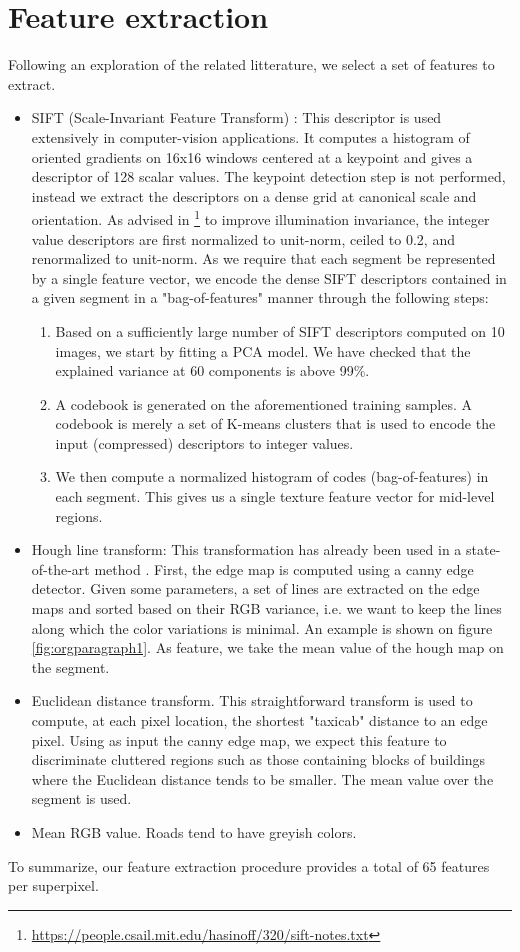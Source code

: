\documentclass[10pt,conference,compsocconf]{IEEEtran}
\begin{document}
\section{Feature extraction}
\label{sec:orgheadline9}
Following an exploration of the related litterature, we select a set of features to extract.
\begin{itemize}
\item SIFT (Scale-Invariant Feature Transform) \cite{lowe99}: This descriptor is used extensively in computer-vision applications. It computes a histogram of oriented gradients on 16x16 windows centered at a keypoint and gives a descriptor of 128 scalar values. The keypoint detection step is not performed, instead we extract the descriptors on a dense grid at canonical scale and orientation. As advised in \footnote{\url{https://people.csail.mit.edu/hasinoff/320/sift-notes.txt}



\printbibliography} to improve illumination invariance, the integer value descriptors are first normalized to unit-norm, ceiled to 0.2, and renormalized to unit-norm. As we require that each segment be represented by a single feature vector, we encode the dense SIFT descriptors contained in a given segment in a "bag-of-features" manner through the following steps: 
\begin{enumerate}
\item Based on a sufficiently large number of SIFT descriptors computed on 10 images, we start by fitting a PCA model. We have checked that the explained variance at 60 components is above 99\%.
\item A codebook is generated on the aforementioned training samples. A codebook is merely a set of K-means clusters that is used to encode the input (compressed) descriptors to integer values.
\item We then compute a normalized histogram of codes (bag-of-features) in each segment. This gives us a single texture feature vector for mid-level regions.
\end{enumerate}
\item Hough line transform: This transformation has already been used in a state-of-the-art method \cite{2016ISPAr41B3..891L}. First, the edge map is computed using a canny edge detector. Given some parameters, a set of lines are extracted on the edge maps and sorted based on their RGB variance, i.e. we want to keep the lines along which the color variations is minimal. An example is shown on figure \ref{fig:orgparagraph1}. As feature, we take the mean value of the hough map on the segment.
\item Euclidean distance transform. This straightforward transform is used to compute, at each pixel location, the shortest "taxicab" distance to an edge pixel. Using as input the canny edge map, we expect this feature to discriminate cluttered regions such as those containing blocks of buildings where the Euclidean distance tends to be smaller. The mean value over the segment is used.
\item Mean RGB value. Roads tend to have greyish colors.
\end{itemize}
To summarize, our feature extraction procedure provides a total of 65 features per superpixel.
\end{document}
